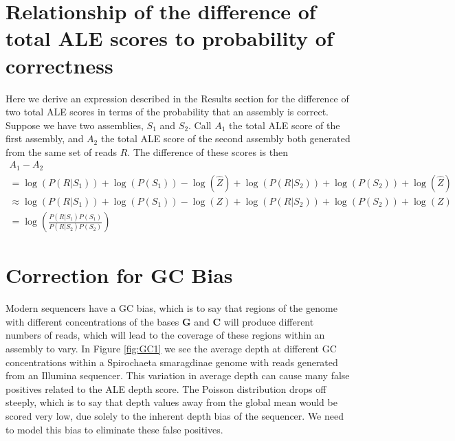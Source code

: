 \documentclass[phd,tocprelim]{cornell}
\begin{document}

\section{Relationship of the difference of total ALE scores to probability of correctness} %
\label{sec:Relationship of the difference of total ALE scores to probability of correctness}

Here we derive an expression described in the Results section for the difference of two total ALE scores in terms of the probability that an assembly is correct.  Suppose we have two assemblies, $S_{1}$ and $S_{2}$.  Call $A_{1}$ the total ALE score of the first assembly, and $A_{2}$ the total ALE score of the second assembly both generated from the same set of reads $R$. The difference of these scores is then
\begin{equation}
    \begin{array}{l}
        A_{1} - A_{2} \\
        = \log\left(P\left(R|S_{1}\right)\right) + \log\left(P\left(S_{1}\right)\right) - \log\left(\hat{Z}\right) + \log\left(P\left(R|S_{2}\right)\right) + \log\left(P\left(S_{2}\right)\right) + \log\left(\hat{Z}\right) \\
        \approx \log\left(P\left(R|S_{1}\right)\right) + \log\left(P\left(S_{1}\right)\right) - \log\left(Z\right) + \log\left(P\left(R|S_{2}\right)\right) + \log\left(P\left(S_{2}\right)\right) + \log\left(Z\right) \\
        = \log\left(\frac{P\left(R|S_{1}\right)P\left(S_{1}\right)}{P\left(R|S_{2}\right)P\left(S_{2}\right)}\right)
    \end{array}
\end{equation}


\section{Correction for GC Bias} %
\label{sec:Correction for GC Bias}

Modern sequencers have a GC bias, which is to say that regions of the genome with different concentrations of the bases {\bf G} and {\bf C} will produce different numbers of reads, which will lead to the coverage of these regions within an assembly to vary. In Figure \ref{fig:GC1} we see the average depth at different GC concentrations within a Spirochaeta smaragdinae genome with reads generated from an Illumina sequencer. This variation in average depth can cause many false positives related to the ALE depth score. The Poisson distribution drops off steeply, which is to say that depth values away from the global mean would be scored very low, due solely to the inherent depth bias of the sequencer. We need to model this bias to eliminate these false positives.
\end{document}
